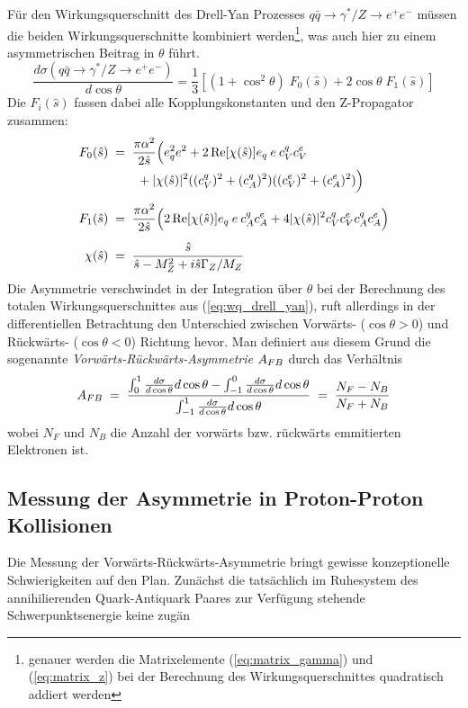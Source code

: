 Für den Wirkungsquerschnitt des Drell-Yan Prozesses $q\bar q \rightarrow
\gamma^*/Z \rightarrow e^+e^-$ müssen die beiden Wirkungsquerschnitte
kombiniert werden\footnote{genauer werden die Matrixelemente
(\ref{eq:matrix_gamma}) und (\ref{eq:matrix_z}) bei der Berechnung des
Wirkungsquerschnittes quadratisch addiert werden}, was auch hier zu einem 
asymmetrischen Beitrag in $\theta$ führt.
\begin{equation}
    \frac{d\sigma(q\bar q\rightarrow\gamma^*/Z\rightarrow e^+e^-)}{d\cos\theta}
        = \frac{1}{3}
          \left[
              (1+\cos^2\theta) \; F_0(\hat s)
              + 2\cos\theta \; F_1(\hat s)
          \right]
    \label{eq:wq_drell_yan}
\end{equation}
Die $F_i(\hat s)$ fassen dabei alle Kopplungskonstanten und den Z-Propagator
zusammen:
\begin{align}
    F_0(\hat s) \; &= \;
        \frac{\pi \alpha^2}{2 \hat s}
        \Bigl(
            e_q^2 e^2 + 2 \operatorname{Re}[\chi(\hat s)] e_q \:e\: c_V^q c_V^e
            \nonumber \\ & \qquad
            + |\chi(\hat s)|^2 ((c_V^q)^2+(c_A^q)^2)((c_V^e)^2+(c_A^e)^2)
        \Bigr)
        \\[5pt]
    F_1(\hat s) \; &= \;
        \frac{\pi \alpha^2}{2 \hat s}
        \Bigl(
            2\operatorname{Re}[\chi(\hat s)] e_q \:e\: c_A^q c_A^e
            + 4|\chi(\hat s)|^2 c_V^q c_V^e c_A^q c_A^e
        \Bigr)
        \\[5pt]
    \chi(\hat s) \; &= \;
        \frac{\hat s}{\hat s - M_Z^2 + i\hat s \Gamma_Z/M_Z}
\end{align}
Die Asymmetrie verschwindet in der Integration über $\theta$ bei der
Berechnung des totalen Wirkungsquerschnittes aus (\ref{eq:wq_drell_yan}), ruft
allerdings in der differentiellen Betrachtung den Unterschied zwischen
Vorwärts- ($\cos\theta > 0$) und Rückwärts- ($\cos\theta < 0$) Richtung hevor. 
Man definiert aus diesem Grund die sogenannte
\textit{Vorwärts-Rückwärts-Asymmetrie} $A_{FB}$ durch das Verhältnis
\begin{equation}
    A_{FB} \;=\; \frac{ \int_0^1    \frac{d\sigma}{d\cos\theta} d\cos\theta
                    - \int_{-1}^0 \frac{d\sigma}{d\cos\theta} d\cos\theta
                    }{\int_{-1}^1 \frac{d\sigma}{d\cos\theta} d\cos\theta}
         \;=\; \frac{N_F - N_B}{N_F + N_B}
\end{equation}
wobei $N_F$ und $N_B$ die Anzahl der vorwärts bzw. rückwärts emmitierten
Elektronen ist.



\subsection{Messung der Asymmetrie in Proton-Proton Kollisionen}
\label{theory:afb_hadron_collider}

Die Messung der Vorwärts-Rückwärts-Asymmetrie bringt gewisse konzeptionelle
Schwierigkeiten auf den Plan. Zunächst die tatsächlich im Ruhesystem des
annihilierenden Quark-Antiquark Paares zur Verfügung stehende
Schwerpunktsenergie keine zugän









